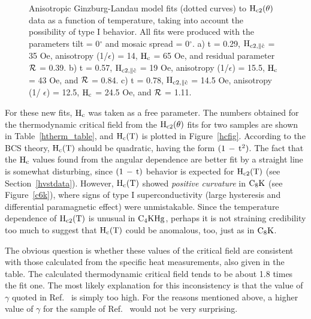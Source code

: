 \begin{figure}
\vspace{7.5in}
\caption[Anisotropic Ginzburg-Landau model fits   to $\rm
H_{c2}(\theta)$ data as a function of temperature,  taking into account the
possibility of  type  I behavior.]{Anisotropic  Ginzburg-Landau  model fits
(dotted curves) to $\rm H_{c2}(\theta)$ data as  a function of temperature,
taking into  account  the possibility of  type I  behavior.  All  fits were
produced   with the parameters  tilt  =  0$^{\circ}$  and mosaic   spread =
0$^{\circ}$.   a) t   =  0.29,  $\rm  H_{c2,\parallel\hat{c}}$ =    35  Oe,
anisotropy (1/$\epsilon$) = 14,  $\rm H_c$ = 65 Oe,  and residual parameter
$\cal R$ = 0.39.  b) t = 0.57, $\rm H_{c2, 
\parallel\hat{c}}$ =  19 Oe,  anisotropy (1/$\epsilon$)  = 15.5, $\rm
H_c$ =  43    Oe,   and   $\cal   R$ =    0.84.      c) t  =   0.78,   $\rm
H_{c2,\parallel\hat{c}}$ = 14.5 Oe, anisotropy (1/ $\epsilon$) = 12.5, $\rm
H_c$ = 24.5 Oe, and $\cal R$ = 1.11.}
\label{hctemp}
\end{figure}

	For these new fits, $\rm H_c$ was taken  as a free  parameter.  The
numbers  obtained for  the  thermodynamic critical   field from   the  $\rm
H_{c2}(\theta)$ fits for two samples are shown in Table~\ref{htherm_table},
and $\rm H_{c}(T)$ is plotted in Figure~\ref{hcfig}.   According to the BCS
theory, $\rm H_{c}(T)$ should be  quadratic, having the form $\rm  (1 \, -
\, t^2)$.   The fact that  the $\rm H_{c}$  values  found from  the angular
dependence are better fit by a straight line  is somewhat disturbing, since
$\rm  (1  \,  -  \, t)$  behavior  is  expected  for  $\rm  H_{c2}(T)$ (see
Section~\ref{hvstdata}).  However, $\rm   H_{c}(T)$ showed  {\em   positive
curvature\/} in  $\rm C_8K$ (see Figure~\ref{c6k}), where  signs of  type I
superconductivity (large hysteresis  and differential  paramagnetic effect)
were unmistakable.\cite{koike80} Since the  temperature dependence of  $\rm
H_{c2}(T)$ is   unusual in  $\rm  C_4KHg$, perhaps  it  is    not straining
credibility too much  to suggest that  $\rm H_{c}(T)$  could be  anomalous,
too, just as in $\rm C_8K$.

The obvious question  is whether  these
values of the critical field are consistent with those  calculated from the
specific  heat  measurements, also  given  in  the  table.  The  calculated
thermodynamic critical field tends to be about 1.8 times  the fit one.  The
most  likely  explanation for this   inconsistency   is that the  value  of
$\gamma$ quoted in Ref.~\cite{alexander81}  is  simply too high.   For  the
reasons mentioned above, a  higher value   of  $\gamma$ for  the  sample of
Ref.~\cite{alexander81} would not be very surprising.  

